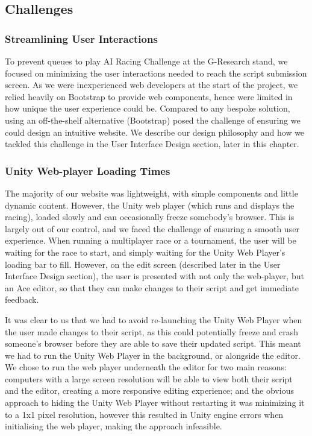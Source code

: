 \subsection{Challenges}

\subsubsection{Streamlining User Interactions}

To prevent queues to play AI Racing Challenge at the G-Research stand, we focused on minimizing the user interactions needed to reach the script submission screen. As we were inexperienced web developers at the start of the project, we relied heavily on Bootstrap to provide web components, hence were limited in how unique the user experience could be. Compared to any bespoke solution, using an off-the-shelf alternative (Bootstrap) posed the challenge of ensuring we could design an intuitive website. We describe our design philosophy and how we tackled this challenge in the User Interface Design section, later in this chapter.

\subsubsection{Unity Web-player Loading Times}

The majority of our website was lightweight, with simple components and little dynamic content. However, the Unity web player (which runs and displays the racing), loaded slowly and can occasionally freeze somebody's browser. This is largely out of our control, and we faced the challenge of ensuring a smooth user experience. When running a multiplayer race or a tournament, the user will be waiting for the race to start, and simply waiting for the Unity Web Player's loading bar to fill. However, on the edit screen (described later in the User Interface Design section), the user is presented with not only the web-player, but an Ace editor, so that they can make changes to their script and get immediate feedback. 

It was clear to us that we had to avoid re-launching the Unity Web Player when the user made changes to their script, as this could potentially freeze and crash someone's browser before they are able to save their updated script. This meant we had to run the Unity Web Player in the background, or alongside the editor. We chose to run the web player underneath the editor for two main reasons: computers with a large screen resolution will be able to view both their script and the editor, creating a more responsive editing experience; and the obvious approach to hiding the Unity Web Player without restarting it was minimizing it to a 1x1 pixel resolution, however this resulted in Unity engine errors when initialising the web player, making the approach infeasible. 

